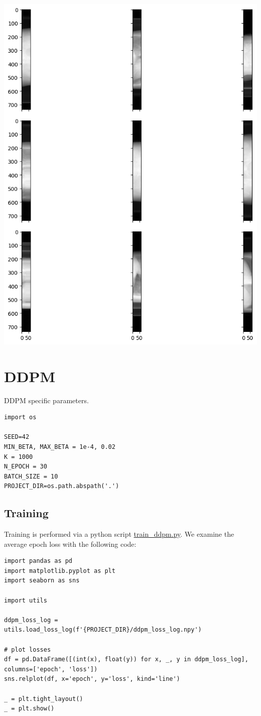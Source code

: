 \documentclass[a4paper, 11pt]{article}
\begin{document}
\begin{center}
\includegraphics[width=.9\linewidth]{./.ob-jupyter/3ef80611a509e68af51208e81a3f5b56871997d5.png}
\end{center}

\section{DDPM}
\label{sec:org0721b85}
DDPM specific parameters.
\begin{verbatim}
import os

SEED=42
MIN_BETA, MAX_BETA = 1e-4, 0.02
K = 1000
N_EPOCH = 30
BATCH_SIZE = 10
PROJECT_DIR=os.path.abspath('.')
\end{verbatim}

\subsection{Training}
\label{sec:org7e00b0b}
Training is performed via a python script \url{train\_ddpm.py}. We examine the average epoch loss with the following code:
\begin{verbatim}
import pandas as pd
import matplotlib.pyplot as plt
import seaborn as sns

import utils

ddpm_loss_log = utils.load_loss_log(f'{PROJECT_DIR}/ddpm_loss_log.npy')

# plot losses
df = pd.DataFrame([(int(x), float(y)) for x, _, y in ddpm_loss_log], columns=['epoch', 'loss'])
sns.relplot(df, x='epoch', y='loss', kind='line')

_ = plt.tight_layout()
_ = plt.show()
\end{verbatim}
\end{document}
